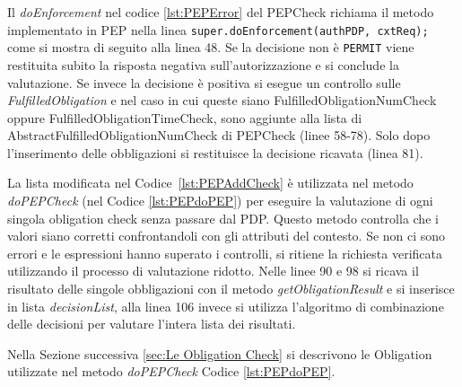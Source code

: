 Il \emph{doEnforcement} nel codice \ref{lst:PEPError} del PEPCheck richiama il metodo implementato in \ac{PEP}
nella linea \texttt{super.doEnforcement(authPDP, cxtReq);} come si mostra di seguito alla linea 48.
Se la decisione non è \texttt{PERMIT} viene restituita subito la risposta negativa sull'autorizzazione e si conclude la valutazione.
Se invece la decisione è positiva si esegue un controllo sulle \emph{FulfilledObligation} e
nel caso in cui queste siano FulfilledObligationNumCheck oppure FulfilledObligationTimeCheck,
sono aggiunte alla lista di AbstractFulfilledObligationNumCheck di PEPCheck (linee 58-78). Solo dopo l'inserimento delle obbligazioni
si restituisce la decisione ricavata (linea 81).

La lista modificata nel Codice~\ref{lst:PEPAddCheck} è utilizzata nel metodo \emph{doPEPCheck} (nel Codice \ref{lst:PEPdoPEP})
per eseguire la valutazione di ogni singola obligation check senza passare dal \ac{PDP}.
Questo metodo controlla che i valori siano corretti confrontandoli con gli attributi del contesto. Se non ci
sono errori e le espressioni hanno superato i controlli, si ritiene la richiesta verificata
utilizzando il processo di valutazione ridotto. Nelle linee 90 e 98 si ricava il risultato delle
singole obbligazioni con il metodo \emph{getObligationResult} e si inserisce in lista \emph{decisionList},
alla linea 106 invece si utilizza l'algoritmo
di combinazione delle decisioni per valutare l'intera lista dei risultati.

Nella Sezione successiva \ref{sec:Le Obligation Check} si descrivono le Obligation utilizzate
nel metodo \emph{doPEPCheck} Codice \ref{lst:PEPdoPEP}.

